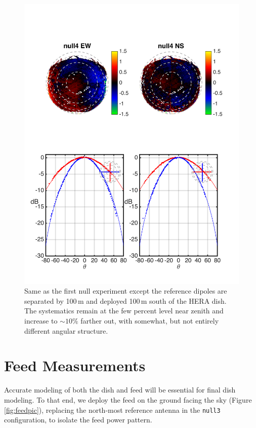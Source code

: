 \documentclass{emulateapj}
\begin{document}
\begin{figure}[h]
\includegraphics[width=6.5in]{null4_rel.png}
\caption{Same as the first null experiment except the reference dipoles are separated by 100\,m and deployed 100\,m south of the HERA dish. The systematics remain at the few percent level near zenith and increase to $\sim10\%$ farther out, with somewhat, but not entirely different angular structure. }
\label{fig:null4}
\end{figure}

\section{Feed Measurements}

Accurate modeling of both the dish and feed will be essential for final dish modeling. To that end, we deploy the feed on the ground facing the sky (Figure \ref{fig:feedpic}), replacing the north-most reference antenna in the \texttt{null3} configuration, to isolate the feed power pattern. 
\end{document}
